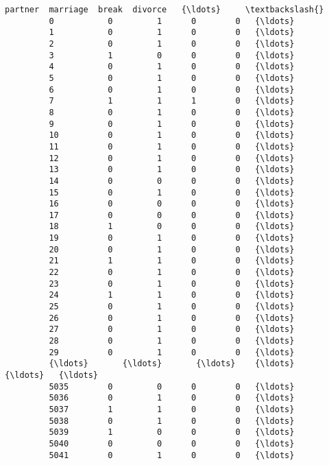 \documentclass[11pt]{article}
\begin{document}
\begin{Verbatim}[commandchars=\\\{\}]
               partner  marriage  break  divorce   {\ldots}     \textbackslash{}
         0           0         1      0        0   {\ldots}      
         1           0         1      0        0   {\ldots}      
         2           0         1      0        0   {\ldots}      
         3           1         0      0        0   {\ldots}      
         4           0         1      0        0   {\ldots}      
         5           0         1      0        0   {\ldots}      
         6           0         1      0        0   {\ldots}      
         7           1         1      1        0   {\ldots}      
         8           0         1      0        0   {\ldots}      
         9           0         1      0        0   {\ldots}      
         10          0         1      0        0   {\ldots}      
         11          0         1      0        0   {\ldots}      
         12          0         1      0        0   {\ldots}      
         13          0         1      0        0   {\ldots}      
         14          0         0      0        0   {\ldots}      
         15          0         1      0        0   {\ldots}      
         16          0         0      0        0   {\ldots}      
         17          0         0      0        0   {\ldots}      
         18          1         0      0        0   {\ldots}      
         19          0         1      0        0   {\ldots}      
         20          0         1      0        0   {\ldots}      
         21          1         1      0        0   {\ldots}      
         22          0         1      0        0   {\ldots}      
         23          0         1      0        0   {\ldots}      
         24          1         1      0        0   {\ldots}      
         25          0         1      0        0   {\ldots}      
         26          0         1      0        0   {\ldots}      
         27          0         1      0        0   {\ldots}      
         28          0         1      0        0   {\ldots}      
         29          0         1      0        0   {\ldots}      
         {\ldots}       {\ldots}       {\ldots}    {\ldots}      {\ldots}   {\ldots}      
         5035        0         0      0        0   {\ldots}      
         5036        0         1      0        0   {\ldots}      
         5037        1         1      0        0   {\ldots}      
         5038        0         1      0        0   {\ldots}      
         5039        1         0      0        0   {\ldots}      
         5040        0         0      0        0   {\ldots}      
         5041        0         1      0        0   {\ldots}      

\end{Verbatim}
\end{document}
